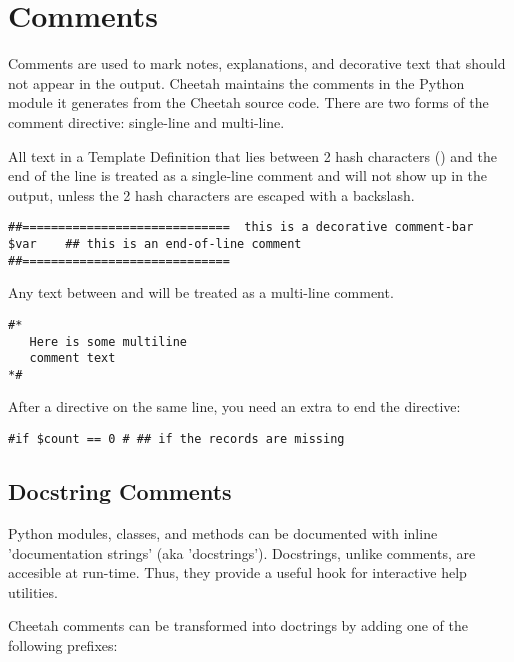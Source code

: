 \section{Comments}
\label{comments}

Comments are used to mark notes, explanations, and decorative text that should
not appear in the output.  Cheetah maintains the comments in the Python module
it generates from the Cheetah source code. There are two forms of the comment
directive: single-line and multi-line.

All text in a Template Definition that lies between 2 hash characters
(\code{\#\#}) and the end of the line is treated as a single-line comment and
will not show up in the output, unless the 2 hash characters are escaped with a
backslash.
\begin{verbatim}
##=============================  this is a decorative comment-bar
$var    ## this is an end-of-line comment
##=============================
\end{verbatim}

Any text between \code{\#*} and \code{*\#} will be treated as a multi-line
comment.
\begin{verbatim}
#*
   Here is some multiline
   comment text
*#
\end{verbatim}

After a directive on the same line, you need an extra \code{\#*} to end the
directive:
\begin{verbatim}
#if $count == 0 # ## if the records are missing
\end{verbatim}



\subsection{Docstring Comments}
\label{directives.comments.docstring}
Python modules, classes, and methods can be documented with inline
'documentation strings' (aka 'docstrings').  Docstrings, unlike comments, are
accesible at run-time. Thus, they provide a useful hook for interactive help
utilities.  

Cheetah comments can be transformed into doctrings by adding one of the
following prefixes:

